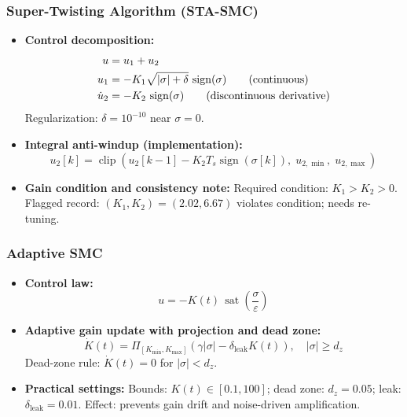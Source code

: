 \documentclass[10pt, a4paper]{article}
\newcommand{\sign}{\operatorname{sign}}
\newcommand{\sat}{\operatorname{sat}}
\begin{document}
\subsubsection{Super-Twisting Algorithm (STA-SMC)}

\begin{itemize}[leftmargin=1.5em,itemsep=0.2em]
  \item \textbf{Control decomposition:}
  \begin{align}
    u     &= u_1 + u_2 \label{eq:sta}\\
    u_1   &= -K_1\sqrt{|\sigma| + \delta}\,\sign(\sigma)
    \qquad \text{(continuous)} \notag\\
    \dot{u}_2 &= -K_2\,\sign(\sigma)
    \qquad \text{(discontinuous derivative)} \notag
  \end{align}
  Regularization: $\delta=10^{-10}$ near $\sigma=0$.

  \item \textbf{Integral anti-windup (implementation):}
  \begin{equation}
    u_2[k] = \operatorname{clip}
    \left(u_2[k-1] - K_2T_s\sign(\sigma[k]),\;
    u_{2,\min},\;u_{2,\max}\right)
  \end{equation}

  \item \textbf{Gain condition and consistency note:}
  Required condition: $K_1 > K_2 > 0$.
  Flagged record: $(K_1,K_2)=(2.02,6.67)$ violates condition; needs re-tuning.
\end{itemize}

\subsubsection{Adaptive SMC}

\begin{itemize}[leftmargin=1.5em,itemsep=0.2em]
  \item \textbf{Control law:}
  \begin{equation}
    u = -K(t)\,\sat\!\left(\frac{\sigma}{\varepsilon}\right)
    \label{eq:adaptive}
  \end{equation}

  \item \textbf{Adaptive gain update with projection and dead zone:}
  \begin{equation}
    \dot{K}(t) = \Pi_{[K_\text{min},K_\text{max}]}
    \!\left(\gamma |\sigma| - \delta_\text{leak}K(t)\right),
    \quad |\sigma| \ge d_z
    \label{eq:adaptive_law}
  \end{equation}
  Dead-zone rule: $\dot{K}(t)=0$ for $|\sigma|<d_z$.

  \item \textbf{Practical settings:}
  Bounds: $K(t)\in[0.1,100]$; dead zone: $d_z=0.05$; leak: $\delta_\text{leak}=0.01$.
  Effect: prevents gain drift and noise-driven amplification.
\end{itemize}
\end{document}
